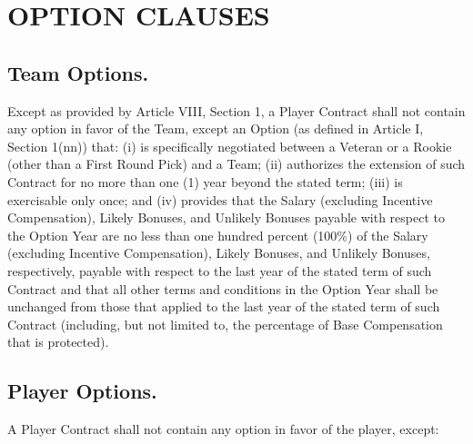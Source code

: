 \documentclass[
]{book}
\begin{document}
\hypertarget{option-clauses}{%
\chapter{OPTION CLAUSES}\label{option-clauses}}

\hypertarget{team-options.}{%
\section{Team Options.}\label{team-options.}}

Except as provided by Article VIII, Section 1, a Player Contract shall not contain any option in favor of the Team, except an Option (as defined in Article I, Section 1(nn)) that: (i) is specifically negotiated between a Veteran or a Rookie (other than a First Round Pick) and a Team; (ii) authorizes the extension of such Contract for no more than one (1) year beyond the stated term; (iii) is exercisable only once; and (iv) provides that the Salary (excluding Incentive Compensation), Likely Bonuses, and Unlikely Bonuses payable with respect to the Option Year are no less than one hundred percent (100\%) of the Salary (excluding Incentive Compensation), Likely Bonuses, and Unlikely Bonuses, respectively, payable with respect to the last year of the stated term of such Contract and that all other terms and conditions in the Option Year shall be unchanged from those that applied to the last year of the stated term of such Contract (including, but not limited to, the percentage of Base Compensation that is protected).

\hypertarget{player-options.}{%
\section{Player Options.}\label{player-options.}}

A Player Contract shall not contain any option in favor of the player, except:
\end{document}
